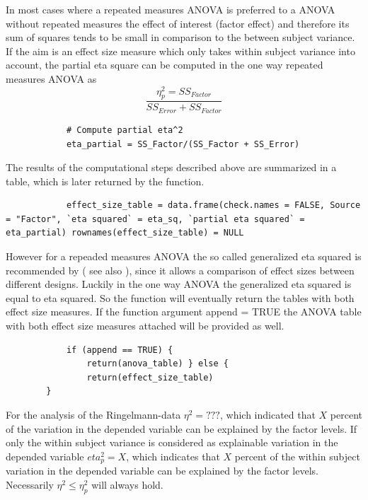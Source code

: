 \documentclass[11pt]{article}
\begin{document}
		In most cases where a repeated measures ANOVA is preferred to a ANOVA without repeated measures the effect of interest (factor effect) and therefore its sum of squares tends to be small in comparison to the between subject variance. If the aim is an effect size measure which only takes within subject variance into account, the partial eta square can be computed in the one way repeated measures ANOVA as\\
		
		\begin{equation}
		\frac{\eta^2_p = SS_{Factor}}{SS_{Error} + SS_{Factor}}
		\end{equation}
		
		\begin{lstlisting}
			# Compute partial eta^2 
			eta_partial = SS_Factor/(SS_Factor + SS_Error)
		\end{lstlisting}
		
		The results of the computational steps described above are summarized in a table, which is later returned by the function.\\
		
		\begin{lstlisting}
			effect_size_table = data.frame(check.names = FALSE, Source = "Factor", `eta squared` = eta_sq, `partial eta squared` = eta_partial) rownames(effect_size_table) = NULL
		\end{lstlisting}
		
		However for a repeaded measures ANOVA the so called generalized eta squared is recommended by \citep{bakeman2005recommended}( see also \cite{olejnik2003generalized}), since it allows a comparison of effect sizes between different designs. Luckily in the one way ANOVA the generalized eta squared is equal to eta squared. So the function will eventually return the tables with both effect size measures. If the function
		argument append = TRUE the ANOVA table with both effect size measures attached will be provided as well.\\
		
		\begin{lstlisting}
			if (append == TRUE) {
				return(anova_table) } else {
				return(effect_size_table) 
		}
		\end{lstlisting}
		
		For the analysis of the Ringelmann-data $\eta^2=???$, which indicated that $𝑋$ percent of the variation in the depended variable can be explained by the factor levels. If only the within subject variance is considered as explainable variation in the depended variable $eta^2_p=𝑋$, which indicates that $𝑋$ percent of the within subject variation in the depended variable can be explained by the factor levels. Necessarily $\eta^2\leq\eta_𝑝^2$ will always hold.
		
\end{document}
